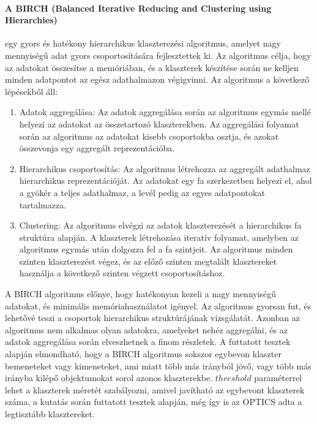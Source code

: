 \documentclass[acmtog, authorversion]{acmart}
\begin{document}
\paragraph{A BIRCH (Balanced Iterative Reducing and Clustering using Hierarchies)}  egy gyors és hatékony hierarchikus klaszterezési algoritmus, amelyet nagy mennyiségű adat gyors csoportosítására fejlesztettek ki. Az algoritmus célja, hogy az adatokat összesítse a memóriában, és a klaszterek készítése során ne kelljen minden adatpontot az egész adathalmazon végigvinni.
Az algoritmus a következő lépésekből áll:
\begin{enumerate}
    \item Adatok aggregálása: Az adatok aggregálása során az algoritmus egymás mellé helyezi az adatokat az összetartozó klaszterekben. Az aggregálási folyamat során az algoritmus az adatokat kisebb csoportokba osztja, és azokat összevonja egy aggregált reprezentációba.
    \item Hierarchikus csoportosítás: Az algoritmus létrehozza az aggregált adathalmaz hierarchikus reprezentációját. Az adatokat egy fa szerkezetben helyezi el, ahol a gyökér a teljes adathalmaz, a levél pedig az egyes adatpontokat tartalmazza.
    \item Clustering: Az algoritmus elvégzi az adatok klaszterezését a hierarchikus fa struktúra alapján. A klaszterek létrehozása iteratív folyamat, amelyben az algoritmus egymás után dolgozza fel a fa szintjeit. Az algoritmus minden szinten klaszterezést végez, és az előző szinten megtalált klasztereket használja a következő szinten végzett csoportosításhoz.
\end{enumerate}
A BIRCH algoritmus előnye, hogy hatékonyan kezeli a nagy mennyiségű adatokat, és minimális memóriahasználatot igényel. Az algoritmus gyorsan fut, és lehetővé teszi a csoportok hierarchikus struktúrájának vizsgálatát. Azonban az algoritmus nem alkalmas olyan adatokra, amelyeket nehéz aggregálni, és az adatok aggregálása során elveszhetnek a finom részletek.
A futtatott tesztek alapján elmondható, hogy a BIRCH algoritmus sokszor egybevon klaszter bemeneteket vagy kimeneteket, ami miatt több más irányból jövő, vagy több más irányba kilépő objektumokat sorol azonos klaszterekbe.
\begin{math}threshold\end{math} paraméterrel lehet a klaszterek méretét szabályozni, amivel javítható az egybevont klaszterek száma, a kutatás során futtatott tesztek alapján, még így is az OPTICS adta a legtisztább klasztereket. 
\end{document}
